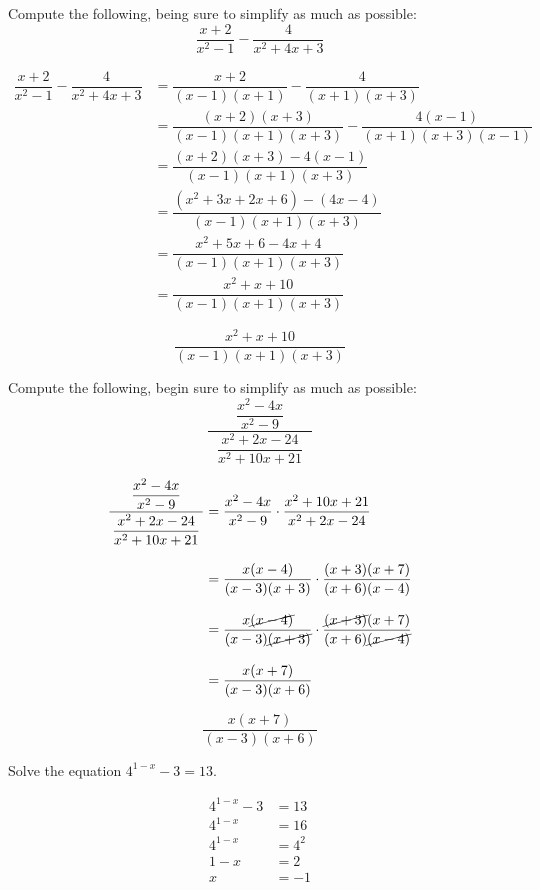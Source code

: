\documentclass[12pt,letterpaper]{exam}
\begin{document}
\begin{questions}
\newpage
\question[5] Compute the following, being sure to simplify as much as possible: 
	\[
	\dfrac{x + 2}{x^2 - 1} - \dfrac{4}{x^2 + 4x + 3}
	\] \pspace

	\[
	\begin{aligned}
	\dfrac{x + 2}{x^2 - 1} - \dfrac{4}{x^2 + 4x + 3}&= \dfrac{x + 2}{(x - 1)(x + 1)} - \dfrac{4}{(x + 1)(x + 3)} \\[0.3cm]
	&= \dfrac{(x + 2)(x + 3)}{(x - 1)(x + 1)(x + 3)} - \dfrac{4(x - 1)}{(x + 1)(x + 3)(x -1)} \\[0.3cm]
	&= \dfrac{(x + 2)(x + 3) - 4(x - 1)}{(x - 1)(x + 1)(x + 3)} \\[0.3cm]
	&= \dfrac{(x^2 + 3x + 2x + 6) - (4x - 4)}{(x - 1)(x + 1)(x + 3)} \\[0.3cm]
	&= \dfrac{x^2 + 5x + 6 - 4x + 4}{(x - 1)(x + 1)(x + 3)} \\[0.3cm]
	&= \dfrac{x^2 + x + 10}{(x - 1)(x + 1)(x + 3)}
	\end{aligned}
	\] \pspace
	
	\[
	\boxed{\dfrac{x^2 + x + 10}{(x - 1)(x + 1)(x + 3)}}
	\]





\newpage
\question[5] Compute the following, begin sure to simplify as much as possible:
	\[
	\dfrac{\phantom{--}\dfrac{x^2 - 4x}{x^2 - 9}\phantom{--}}{\dfrac{x^2 + 2x - 24}{x^2 + 10x + 21}}
	\] \pspace

	\[
	\begin{aligned}
	\dfrac{\phantom{--}\dfrac{x^2 - 4x}{x^2 - 9}\phantom{--}}{\dfrac{x^2 + 2x - 24}{x^2 + 10x + 21}}&= \dfrac{x^2 - 4x}{x^2 - 9} \cdot \dfrac{x^2 + 10x + 21}{x^2 + 2x - 24} \\[0.3cm]
	&= \dfrac{x(x - 4)}{(x - 3)(x + 3)} \cdot \dfrac{(x + 3)(x + 7)}{(x + 6)(x - 4)} \\[0.3cm]
	&= \dfrac{x\cancel{(x - 4)}}{(x - 3)\cancel{(x + 3)}} \cdot \dfrac{\cancel{(x + 3)}(x + 7)}{(x + 6)\cancel{(x - 4)}} \\[0.3cm]
	&= \dfrac{x(x + 7)}{(x - 3)(x + 6)}
	\end{aligned}
	\] \pspace
	
	\[
	\boxed{\dfrac{x(x + 7)}{(x - 3)(x + 6)}}
	\]





\newpage
\question[5] Solve the equation $4^{1 - x} - 3= 13$. \pspace

	\[
	\begin{aligned}
	4^{1 - x} - 3&= 13 \\[0.3cm]
	4^{1 - x}&= 16 \\[0.3cm]
	4^{1 - x}&= 4^2 \\[0.3cm]
	1 - x&= 2 \\[0.3cm]
	x&= -1
	\end{aligned}
	\]
	

\end{questions}
\end{document}
